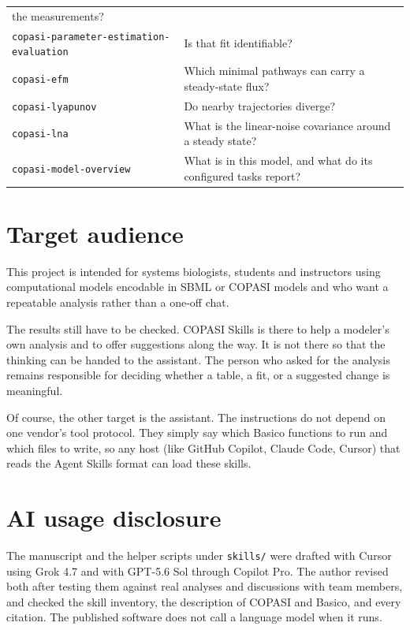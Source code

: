 \documentclass[10pt,a4paper,onecolumn]{article}
\begin{document}
\begin{longtable}[]{@{}
    >{\raggedright\arraybackslash}p{}
    >{\raggedright\arraybackslash}p{}@{}}
  the measurements? \\
  \texttt{copasi-parameter-estimation-evaluation} & Is that fit
  identifiable? \\
  \texttt{copasi-efm} & Which minimal pathways can carry a steady-state
  flux? \\
  \texttt{copasi-lyapunov} & Do nearby trajectories diverge? \\
  \texttt{copasi-lna} & What is the linear-noise covariance around a
  steady state? \\
  \texttt{copasi-model-overview} & What is in this model, and what do its
  configured tasks report? \\
  \end{longtable}

  \section{Target audience}\label{target-audience}

  This project is intended for systems biologists, students and
  instructors using computational models encodable in SBML or COPASI
  models and who want a repeatable analysis rather than a one-off chat.

  The results still have to be checked. COPASI Skills is there to help a
  modeler’s own analysis and to offer suggestions along the way. It is not
  there so that the thinking can be handed to the assistant. The person
  who asked for the analysis remains responsible for deciding whether a
  table, a fit, or a suggested change is meaningful.

  Of course, the other target is the assistant. The instructions do not
  depend on one vendor’s tool protocol. They simply say which Basico
  functions to run and which files to write, so any host (like GitHub
  Copilot, Claude Code, Cursor) that reads the Agent Skills format can
  load these skills.

  \section{AI usage disclosure}\label{ai-usage-disclosure}

  The manuscript and the helper scripts under \texttt{skills/} were
  drafted with Cursor using Grok 4.7 and with GPT-5.6 Sol through Copilot
  Pro. The author revised both after testing them against real analyses
  and discussions with team members, and checked the skill inventory, the
  description of COPASI and Basico, and every citation. The published
  software does not call a language model when it runs.
\end{document}
